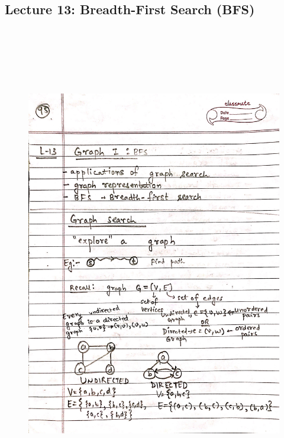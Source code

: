 {\color{black} \subsection*{Lecture 13: Breadth-First Search (BFS)}}
\begin{figure}[H]
    \centering
    \includegraphics[width=16cm, height=21cm]{"./MIT-6.006/MIT-6006-095"}
\end{figure}

